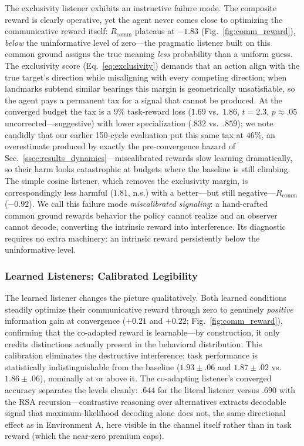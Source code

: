 \documentclass{article}
\newcommand{\Rcomm}{R_{\text{comm}}}
\begin{document}
The exclusivity listener exhibits an instructive failure mode. The composite reward is clearly operative, yet the agent never comes close to optimizing the communicative reward itself: $\Rcomm$ plateaus at $-1.83$ (Fig.~\ref{fig:comm_reward}), \emph{below} the uninformative level of zero---the pragmatic listener built on this common ground assigns the true meaning \emph{less} probability than a uniform guess. The exclusivity score (Eq.~\ref{eq:exclusivity}) demands that an action align with the true target's direction while misaligning with every competing direction; when landmarks subtend similar bearings this margin is geometrically unsatisfiable, so the agent pays a permanent tax for a signal that cannot be produced. At the converged budget the tax is a $9\%$ task-reward loss ($1.69$ vs.\ $1.86$, $t=2.3$, $p\approx.05$ uncorrected---suggestive) with lower specialization ($.832$ vs.\ $.859$); we note candidly that our earlier 150-cycle evaluation put this same tax at $46\%$, an overestimate produced by exactly the pre-convergence hazard of Sec.~\ref{ssec:results_dynamics}---miscalibrated rewards slow learning dramatically, so their harm looks catastrophic at budgets where the baseline is still climbing. The simple cosine listener, which removes the exclusivity margin, is correspondingly less harmful ($1.81$, n.s.) with a better---but still negative---$\Rcomm$ ($-0.92$). We call this failure mode \emph{miscalibrated signaling}: a hand-crafted common ground rewards behavior the policy cannot realize and an observer cannot decode, converting the intrinsic reward into interference. Its diagnostic requires no extra machinery: an intrinsic reward persistently below the uninformative level.

\subsubsection{Learned Listeners: Calibrated Legibility}
\label{ssec:results_learned}

The learned listener changes the picture qualitatively. Both learned conditions steadily optimize their communicative reward through zero to genuinely \emph{positive} information gain at convergence ($+0.21$ and $+0.22$; Fig.~\ref{fig:comm_reward}), confirming that the co-adapted reward is learnable---by construction, it only credits distinctions actually present in the behavioral distribution. This calibration eliminates the destructive interference: task performance is statistically indistinguishable from the baseline ($1.93\pm.06$ and $1.87\pm.02$ vs.\ $1.86\pm.06$), nominally at or above it. The co-adapting listener's converged accuracy separates the levels cleanly: $.644$ for the literal listener versus $.690$ with the RSA recursion---contrastive reasoning over alternatives extracts decodable signal that maximum-likelihood decoding alone does not, the same directional effect as in Environment A, here visible in the channel itself rather than in task reward (which the near-zero premium caps).
\end{document}
